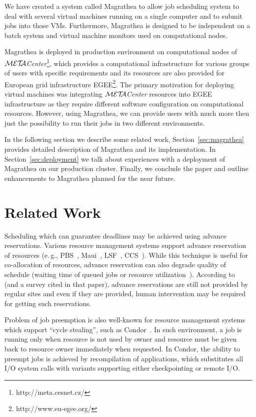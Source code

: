 \documentclass{sigplanconf}
\def\META#1{\textit{${\cal MET\!\!A}$#1}}
\begin{document}
We have created a system called Magrathea to allow job scheduling system to
deal with several virtual machines running on a single computer and to submit
jobs into those VMs. Furthermore, Magrathea is designed to be independent on
a batch system and virtual machine monitors used on computational nodes.

Magrathea is deployed in production environment on computational nodes of
\META{Center}\footnote{http://meta.cesnet.cz/}, which provides a computational
infrastructure for various groups of users with specific requirements and its
resources are also provided for European grid infrastructure
EGEE\footnote{http://www.eu-egee.org/}. The primary motivation for deploying
virtual machines was integrating \META{Center} resources into EGEE
infrastructure as they require different software configuration on
computational resources. However, using Magrathea, we can provide users with
much more then just the possibility to run their jobs in two different
environments.

In the following section we describe some related work,
Section~\ref{sec:magrathea} provides detailed description of Magrathea and its
implementation. In Section~\ref{sec:deployment} we talk about experiences with
a deployment of Magrathea on our production cluster. Finally, we conclude the
paper and outline enhancements to Magrathea planned for the near future.


\section{Related Work}

Scheduling which can guarantee deadlines may be achieved using advance
reservations. Various resource management systems support advance reservation
of resources (e.\,g., PBS~\cite{pbs}, Maui~\cite{maui}, LSF~\cite{lsf},
CCS~\cite{ccs}). While this technique is useful for co-allocation of
resources, advance reservation can also degrade quality of schedule (waiting
time of queued jobs or resource utilization~\cite{smith}). According
to~\cite{singh} (and a survey cited in that paper), advance reservations are
still not provided by regular sites and even if they are provided, human
intervention may be required for getting such reservations.

Problem of job preemption is also well-known for resource management systems
which support ``cycle stealing'', such as Condor~\cite{condor}. In such
environment, a job is running only when resource is not used by owner and
resource must be given back to resource owner immediately when requested. In
Condor, the ability to preempt jobs is achieved by recompilation of
applications, which substitutes all I/O system calls with variants supporting
either checkpointing or remote I/O.
\end{document}
